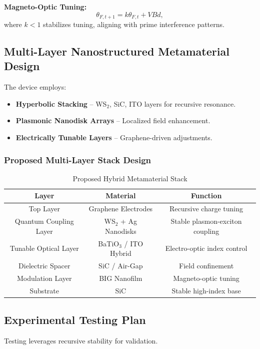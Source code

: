 \documentclass{article}
\theoremstyle{plain}
\begin{document}
\textbf{Magneto-Optic Tuning:}
\begin{equation}
    \theta_{F,t+1} = k \theta_{F,t} + V B d,
\end{equation}
where \( k < 1 \) stabilizes tuning, aligning with prime interference patterns.

\subsection{Multi-Layer Nanostructured Metamaterial Design}
The device employs:
\begin{itemize}
    \item \textbf{Hyperbolic Stacking} – WS$_2$, SiC, ITO layers for recursive resonance.
    \item \textbf{Plasmonic Nanodisk Arrays} – Localized field enhancement.
    \item \textbf{Electrically Tunable Layers} – Graphene-driven adjustments.
\end{itemize}

\subsubsection{Proposed Multi-Layer Stack Design}
\begin{table}[h]
    \centering
    \begin{tabular}{|c|c|c|}
        \hline
        \textbf{Layer} & \textbf{Material} & \textbf{Function} \\
        \hline
        Top Layer & Graphene Electrodes & Recursive charge tuning \\
        Quantum Coupling Layer & WS$_2$ + Ag Nanodisks & Stable plasmon-exciton coupling \\
        Tunable Optical Layer & BaTiO$_3$ / ITO Hybrid & Electro-optic index control \\
        Dielectric Spacer & SiC / Air-Gap & Field confinement \\
        Modulation Layer & BIG Nanofilm & Magneto-optic tuning \\
        Substrate & SiC & Stable high-index base \\
        \hline
    \end{tabular}
    \caption{Proposed Hybrid Metamaterial Stack}
\end{table}

\subsection{Experimental Testing Plan}
Testing leverages recursive stability for validation.
\end{document}
